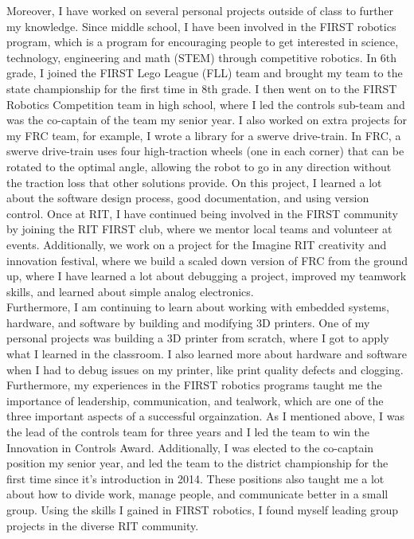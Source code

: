 \documentclass[line,margin]{res}
\begin{document}
\begin{resume}
\begin{adjustwidth}{-92pt}{0pt}
\noindent
Moreover, I have worked on several personal projects outside of class to further my knowledge. Since middle school, I have been involved in the FIRST robotics program, which is a program for encouraging people to get interested in science, technology, engineering and math (STEM) through competitive robotics. In 6th grade, I joined the FIRST Lego League (FLL) team and brought my team to the state championship for the first time in 8th grade. I then went on to the FIRST Robotics Competition team in high school, where I led the controls sub-team and was the co-captain of the team my senior year. I also worked on extra projects for my FRC team, for example, I wrote a library for a swerve drive-train. In FRC, a swerve drive-train uses four high-traction wheels (one in each corner) that can be rotated to the optimal angle, allowing the robot to go in any direction without the traction loss that other solutions provide. On this project, I learned a lot about the software design process, good documentation, and using version control. Once at RIT, I have continued being involved in the FIRST community by joining the RIT FIRST club, where we mentor local teams and volunteer at events. Additionally, we work on a project for the Imagine RIT creativity and innovation festival, where we build a scaled down version of FRC from the ground up, where I have learned a lot about debugging a project, improved my teamwork skills, and learned about simple analog electronics. \\

\noindent
Furthermore, I am continuing to learn about working with embedded systems, hardware, and software by building and modifying 3D printers. One of my personal projects was building a 3D printer from scratch, where I got to apply what I learned in the classroom. I also learned more about hardware and software when I had to debug issues on my printer, like print quality defects and clogging. \\

\noindent
Furthermore, my experiences in the FIRST robotics programs taught me the importance of leadership, communication, and tealwork, which are one of the three important aspects of a successful orgainzation. As I mentioned above, I was the lead of the controls team for three years and I led the team to win the Innovation in Controls Award. Additionally, I was elected to the co-captain position my senior year, and led the team to the district championship for the first time since it's introduction in 2014. These positions also taught me a lot about how to divide work, manage people, and communicate better in a small group. Using the skills I gained in FIRST robotics, I found myself leading group projects in the diverse RIT community. \\


\end{adjustwidth}
\end{resume}
\end{document}
